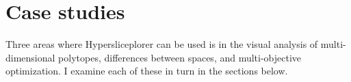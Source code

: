 \section{Case studies}
\label{sec:case_studies}

Three areas where Hypersliceplorer can be used is in the visual analysis of
multi-dimensional polytopes, differences between spaces, and multi-objective
optimization. I examine each of these in turn in the sections below.





